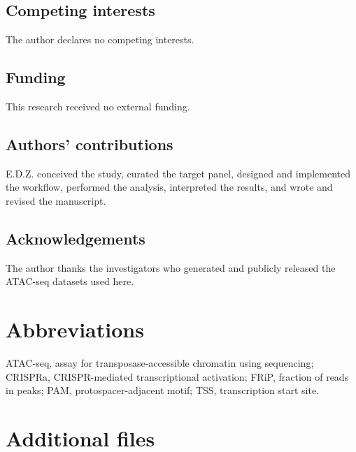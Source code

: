 \documentclass[11pt]{article}
\begin{document}
\subsection*{Competing interests}
The author declares no competing interests.

\subsection*{Funding}
This research received no external funding.

\subsection*{Authors' contributions}
E.D.Z. conceived the study, curated the target panel, designed and implemented the workflow, performed the analysis, interpreted the results, and wrote and revised the manuscript.

\subsection*{Acknowledgements}
The author thanks the investigators who generated and publicly released the ATAC-seq datasets used here.

\section*{Abbreviations}
ATAC-seq, assay for transposase-accessible chromatin using sequencing; CRISPRa, CRISPR-mediated transcriptional activation; FRiP, fraction of reads in peaks; PAM, protospacer-adjacent motif; TSS, transcription start site.

\section*{Additional files}
\end{document}
